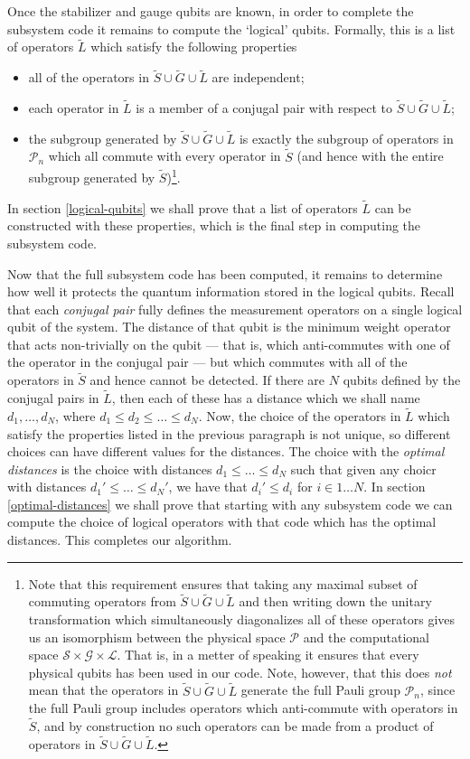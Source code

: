 \documentclass[twocolumn,showpacs,preprintnumbers,amsmath,amssymb,nofootinbib,pra,floatfix]{revtex4}
\newcommand{\set}{\tilde}
\begin{document}
Once the stabilizer and gauge qubits are known, in order to complete the subsystem code it remains to compute the `logical' qubits. Formally, this is a list of operators $\set L$ which satisfy the following properties
\begin{itemize}
\item all of the operators in $\set S \cup \set G \cup \set L$
  are independent;
\item each operator in $\set L$ is a member of a conjugal pair with respect to $\set S \cup \set G \cup \set L$;
\item the subgroup generated by $\set S \cup \set G \cup \set L$ is exactly the subgroup of operators in $\mathcal{P}_n$ which all commute with every operator in $\set S$  (and hence with the entire subgroup generated by $\set S$)\footnote{Note that this requirement ensures that taking any maximal subset of commuting operators from $\set S \cup \set G \cup \set L$ and then writing down the unitary transformation which simultaneously diagonalizes all of these operators gives us an isomorphism between the physical space $\mathscr{P}$ and the computational space $\mathscr{S}\times\mathscr{G}\times\mathscr{L}$.  That is, in a metter of speaking it ensures that every physical qubits has been used in our code.  Note, however, that this does \emph{not} mean that the operators in $\set S \cup \set G \cup \set L$ generate the full Pauli group $\mathcal{P}_n$, since the full Pauli group includes operators which anti-commute with operators in $\set S$, and by construction no such operators can be made from a product of operators in $\set S \cup \set G \cup \set L$.}.
\end{itemize}
In section \ref{logical-qubits} we shall prove that a list of operators $\set L$ can be constructed with these properties, which is the final step in computing the subsystem code.

Now that the full subsystem code has been computed, it remains to determine how well it protects the quantum information stored in the logical qubits.  Recall that each \emph{conjugal pair} fully defines the measurement operators on a single logical qubit of the system.  The distance of that qubit is the minimum weight operator that acts non-trivially on the qubit --- that is, which anti-commutes with one of the operator in the conjugal pair --- but which commutes with all of the operators in $\set S$ and hence cannot be detected.  If there are $N$ qubits defined by the conjugal pairs in $\set L$, then each of these has a distance which we shall name $d_1,\dots,d_N$, where $d_1\le d_2 \le \dots \le d_N$.  Now, the choice of the operators in $\set L$ which satisfy the properties listed in the previous paragraph is not unique, so different choices can have different values for the distances.  The choice with the \emph{optimal distances} is the choice with distances $d_1\le \dots \le d_N$ such that given any choicr with distances $d_1'\le \dots \le d_N'$, we have that $d_i' \le d_i$ for $i\in 1\dots N$.  In section \ref{optimal-distances} we shall prove that starting with any subsystem code we can compute the choice of logical operators with that code which has the optimal distances.  This completes our algorithm.
\end{document}
